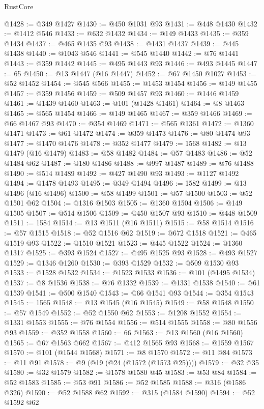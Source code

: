\begin{lexlean}{RustCore}
\begin{coremodule}
@1428 := @349 @1427
@1430 := @450 @1031 @93
@1431 := @448 @1430
@1432 := @1412 @546
@1433 := @632 @1432
@1434 := @149 @1433
@1435 := @359 @1434
@1437 := @465 @1435 @93
@1438 := @1431 @1437
@1439 := @445 @1438
@1440 := @1043 @546
@1441 := @545 @1440
@1442 := @76 @1441
@1443 := @359 @1442
@1445 := @495 @1443 @93
@1446 := @493 @1445
@1447 := 65
@1450 := @13 @1447 (@16 @1447)
@1452 := @67 @1450 @1027
@1453 := @52 @1452
@1454 := @545 @566
@1455 := @1453 @1454
@1456 := @149 @1455
@1457 := @359 @1456
@1459 := @509 @1457 @93
@1460 := @1446 @1459
@1461 := @1439 @1460
@1463 := @101 (@1428 @1461)
@1464 := @8 @1463
@1465 := @565 @1454
@1466 := @149 @1465
@1467 := @359 @1466
@1469 := @66 @1467 @93
@1470 := @354 @1469
@1471 := @565 @1361
@1472 := @1360 @1471
@1473 := @61 @1472
@1474 := @359 @1473
@1476 := @80 @1474 @93
@1477 := @1470 @1476
@1478 := @352 @1477
@1479 := 1568
@1482 := @13 @1479 (@16 @1479)
@1483 := @58 @1482
@1484 := @57 @1483
@1486 := @52 @1484 @62
@1487 := @180 @1486
@1488 := @997 @1487
@1489 := @76 @1488
@1490 := @514 @1489
@1492 := @427 @1490 @93
@1493 := @1127 @1492
@1494 := @1478 @1493
@1495 := @349 @1494
@1496 := 1582
@1499 := @13 @1496 (@16 @1496)
@1500 := @58 @1499
@1501 := @57 @1500
@1503 := @52 @1501 @62
@1504 := @1316 @1503
@1505 := @1360 @1504
@1506 := @149 @1505
@1507 := @514 @1506
@1509 := @450 @1507 @93
@1510 := @448 @1509
@1511 := 1584
@1514 := @13 @1511 (@16 @1511)
@1515 := @58 @1514
@1516 := @57 @1515
@1518 := @52 @1516 @62
@1519 := @672 @1518
@1521 := @465 @1519 @93
@1522 := @1510 @1521
@1523 := @445 @1522
@1524 := @1360 @1317
@1525 := @393 @1524
@1527 := @495 @1525 @93
@1528 := @493 @1527
@1529 := @1346 @1260
@1530 := @393 @1529
@1532 := @509 @1530 @93
@1533 := @1528 @1532
@1534 := @1523 @1533
@1536 := @101 (@1495 @1534)
@1537 := @8 @1536
@1538 := @76 @1332
@1539 := @1331 @1538
@1540 := @61 @1539
@1541 := @500 @1540
@1543 := @66 @1541 @93
@1544 := @354 @1543
@1545 := 1565
@1548 := @13 @1545 (@16 @1545)
@1549 := @58 @1548
@1550 := @57 @1549
@1552 := @52 @1550 @62
@1553 := @1208 @1552
@1554 := @1331 @1553
@1555 := @76 @1554
@1556 := @514 @1555
@1558 := @80 @1556 @93
@1559 := @352 @1558
@1560 := 66
@1563 := @13 @1560 (@16 @1560)
@1565 := @67 @1563 @662
@1567 := @412 @1565 @93
@1568 := @1559 @1567
@1570 := @101 (@1544 @1568)
@1571 := @8 @1570
@1572 := @11 @84
@1573 := @11 @91
@1578 := @9 (@19 (@24 (@1572 (@1573 @25))))
@1579 := @32 @35
@1580 := @32 @1579
@1582 := @1578 @1580 @45
@1583 := @53 @84
@1584 := @52 @1583
@1585 := @53 @91
@1586 := @52 @1585
@1588 := @316 (@1586 @326)
@1590 := @52 @1588 @62
@1592 := @315 (@1584 @1590)
@1594 := @52 @1592 @62

\end{coremodule}
\end{lexlean}
